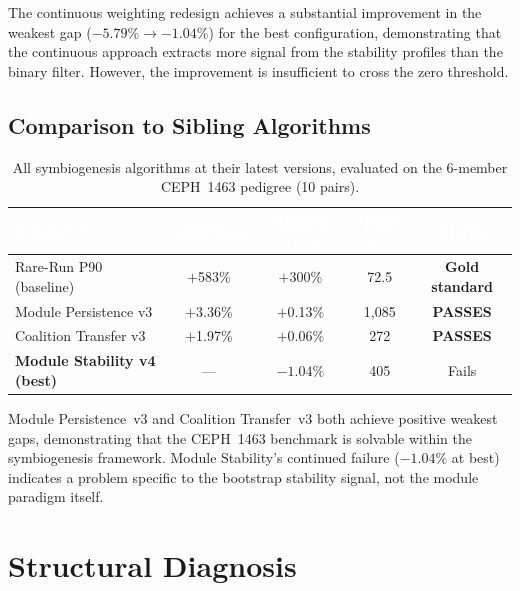 \documentclass{../yalumba}
\begin{document}
The continuous weighting redesign achieves a substantial improvement in the
weakest gap ($-5.79\% \to -1.04\%$) for the best configuration, demonstrating
that the continuous approach extracts more signal from the stability profiles
than the binary filter.  However, the improvement is insufficient to cross
the zero threshold.

\subsection{Comparison to Sibling Algorithms}

\begin{table}[H]
  \centering
  \tablestyle
  \caption{All symbiogenesis algorithms at their latest versions, evaluated on
    the 6-member CEPH~1463 pedigree (10 pairs).}
  \label{tab:family}
  \begin{tabular}{lcccc}
    \toprule
    \rowcolor{table-header}
    \textcolor{white}{\textbf{Algorithm}} &
    \textcolor{white}{\textbf{Separation}} &
    \textcolor{white}{\textbf{Weakest Gap}} &
    \textcolor{white}{\textbf{Time (s)}} &
    \textcolor{white}{\textbf{Status}} \\
    \midrule
    Rare-Run P90 (baseline)
      & $+$583\% & $+$300\% & 72.5 & \textbf{Gold standard} \\
    Module Persistence v3
      & $+$3.36\% & $+$0.13\% & 1{,}085 & \textbf{PASSES} \\
    Coalition Transfer v3
      & $+$1.97\% & $+$0.06\% & 272 & \textbf{PASSES} \\
    \textbf{Module Stability v4 (best)}
      & --- & $\mathbf{-1.04\%}$ & 405 & Fails \\
    \bottomrule
  \end{tabular}
\end{table}

\begin{keyfinding}
Module Persistence~v3 and Coalition Transfer~v3 both achieve positive weakest
gaps, demonstrating that the CEPH~1463 benchmark is solvable within the
symbiogenesis framework.  Module Stability's continued failure ($-1.04\%$ at
best) indicates a problem specific to the bootstrap stability signal, not
the module paradigm itself.
\end{keyfinding}


\section{Structural Diagnosis}
\label{sec:diagnosis}
\end{document}
